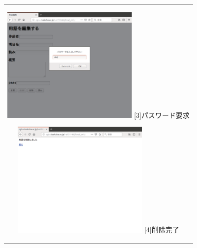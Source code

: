 \documentclass[12pt,a4paper]{jarticle}
\begin{document}
\begin{ttfamily}
\begin{figure}[htbp]
\begin{center}
\begin{tabular}{c}
      \begin{minipage}{0.5\hsize}
        \begin{center}
          \includegraphics[width=6.7cm]{10-3-18.eps}
          \hspace{1.6cm} [3]パスワード要求
        \end{center}
      \end{minipage}

      \begin{minipage}{0.55\hsize}
        \begin{center}
          \includegraphics[width=6.7cm]{10-3-19.eps}
          \hspace{1.6cm} [4]削除完了
        \end{center}
      \end{minipage}

      \begin{minipage}{0.55\hsize}
        \vspace{90mm}
      \end{minipage} \\


\end{tabular}
\end{center}
\end{figure}
\end{ttfamily}
\end{document}

